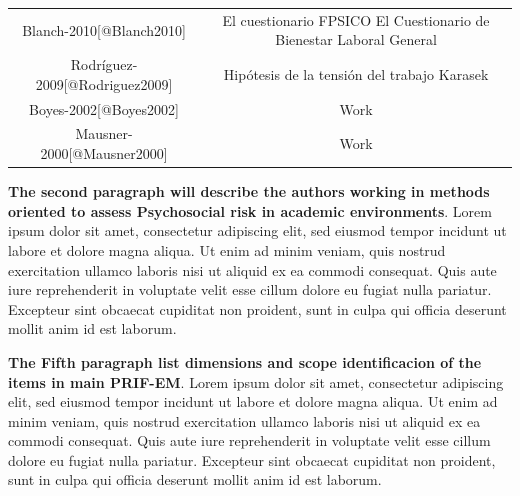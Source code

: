 \documentclass[]{article}
\begin{document}
\begin{longtable}[]{@{}cc@{}}
\begin{minipage}[t]{0.26\columnwidth}\centering
Blanch-2010{[}@Blanch2010{]}\strut
\end{minipage} & \begin{minipage}[t]{0.68\columnwidth}\centering
El cuestionario FPSICO El Cuestionario de Bienestar Laboral
General\strut
\end{minipage}\tabularnewline
\begin{minipage}[t]{0.26\columnwidth}\centering
Rodríguez-2009{[}@Rodriguez2009{]}\strut
\end{minipage} & \begin{minipage}[t]{0.68\columnwidth}\centering
Hipótesis de la tensión del trabajo Karasek\strut
\end{minipage}\tabularnewline
\begin{minipage}[t]{0.26\columnwidth}\centering
Boyes-2002{[}@Boyes2002{]}\strut
\end{minipage} & \begin{minipage}[t]{0.68\columnwidth}\centering
Work\strut
\end{minipage}\tabularnewline
\begin{minipage}[t]{0.26\columnwidth}\centering
Mausner-2000{[}@Mausner2000{]}\strut
\end{minipage} & \begin{minipage}[t]{0.68\columnwidth}\centering
Work\strut
\end{minipage}\tabularnewline
\bottomrule
\end{longtable}

\textbf{The second paragraph will describe the authors working in
methods oriented to assess Psychosocial risk in academic environments}.
Lorem ipsum dolor sit amet, consectetur adipiscing elit, sed eiusmod
tempor incidunt ut labore et dolore magna aliqua. Ut enim ad minim
veniam, quis nostrud exercitation ullamco laboris nisi ut aliquid ex ea
commodi consequat. Quis aute iure reprehenderit in voluptate velit esse
cillum dolore eu fugiat nulla pariatur. Excepteur sint obcaecat
cupiditat non proident, sunt in culpa qui officia deserunt mollit anim
id est laborum.

\textbf{The Fifth paragraph list dimensions and scope identificacion of
the items in main PRIF-EM}. Lorem ipsum dolor sit amet, consectetur
adipiscing elit, sed eiusmod tempor incidunt ut labore et dolore magna
aliqua. Ut enim ad minim veniam, quis nostrud exercitation ullamco
laboris nisi ut aliquid ex ea commodi consequat. Quis aute iure
reprehenderit in voluptate velit esse cillum dolore eu fugiat nulla
pariatur. Excepteur sint obcaecat cupiditat non proident, sunt in culpa
qui officia deserunt mollit anim id est laborum.
\end{document}

